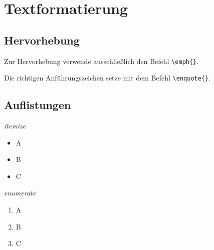 \section{Textformatierung}

\subsection{Hervorhebung}

Zur Hervorhebung verwende ausschließlich den Befehl \lstinline!\emph{}!.

\noindent
Die richtigen Anführungszeichen setze mit dem Befehl \lstinline!\enquote{}!.

\subsection{Auflistungen}

\hfill
\begin{minipage}{0.25\textwidth}
	\emph{itemize}
	\begin{itemize}
		\item A
		\item B
		\item C
	\end{itemize}
\end{minipage}
\hfill
\begin{minipage}{0.25\textwidth}
	\emph{enumerate}
	\begin{enumerate}
		\item A
		\item B
		\item C
	\end{enumerate}
\end{minipage}
\hfill
